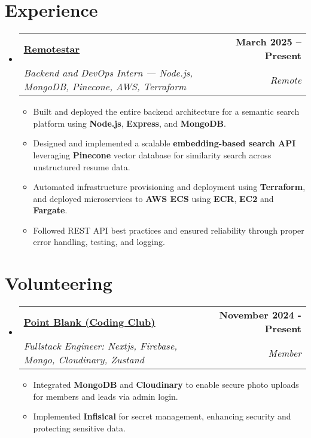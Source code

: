\documentclass[a4paper,11pt]{article}
\makeatletter
\newcommand{\resumeSubheading}[4]{
  \vspace{-2pt}\item
    \begin{tabular*}{1.0\textwidth}[t]{l@{\extracolsep{\fill}}r}
      \textbf{#1} & \textbf{\small #2} \\
      \textit{\small#3} & \textit{\small #4} \\
    \end{tabular*}\vspace{-7pt}
}
\newcommand{\resumeSubHeadingListStart}{\begin{itemize}[leftmargin=0.0in, label={}]}
\newcommand{\resumeSubHeadingListEnd}{\end{itemize}}
\newcommand{\resumeItemListStart}{\begin{itemize}}
\newcommand{\resumeItemListEnd}{\end{itemize}\vspace{-5pt}}
\makeatother
\begin{document}
\section{Experience}
\resumeSubHeadingListStart
\resumeSubheading
{\href{https://www.remotestar.io/}{\underline{Remotestar}}}{March 2025 – Present}
{Backend and DevOps Intern — Node.js, MongoDB, Pinecone, AWS, Terraform}{Remote}
\resumeItemListStart
  \item Built and deployed the entire backend architecture for a semantic search platform using \textbf{Node.js}, \textbf{Express}, and \textbf{MongoDB}.
  \item Designed and implemented a scalable \textbf{embedding-based search API} leveraging \textbf{Pinecone} vector database for similarity search across unstructured resume data.
  \item Automated infrastructure provisioning and deployment using \textbf{Terraform}, and deployed microservices to \textbf{AWS ECS} using \textbf{ECR}, \textbf{EC2} and \textbf{Fargate}.
  \item Followed REST API best practices and ensured reliability through proper error handling, testing, and logging.
\resumeItemListEnd

\vspace{-4pt}

\resumeSubHeadingListEnd

\vspace{-10pt}

\section{Volunteering}
\resumeSubHeadingListStart
  \resumeSubheading
{\href{https://www.pointblank.club/}{\underline{Point Blank (Coding Club)}}}{November 2024 - Present}
  {Fullstack Engineer: Nextjs, Firebase, Mongo, Cloudinary, Zustand}{Member}
  \resumeItemListStart
  \item Integrated \textbf{MongoDB} and \textbf{Cloudinary} to enable secure photo uploads for members and leads via admin login.
  \item Implemented \textbf{Infisical} for secret management, enhancing security and protecting sensitive data. 
  \resumeItemListEnd
  \vspace{-4pt}
\resumeSubHeadingListEnd

\vspace{-10pt}
\end{document}
